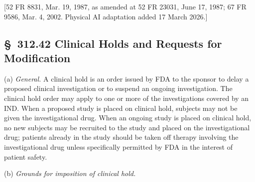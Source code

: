 [52 FR 8831, Mar. 19, 1987, as amended at 52 FR 23031, June 17, 1987; 67 FR 9586, Mar. 4, 2002. Physical AI adaptation added 17 March 2026.]

\subsection{\S~312.42 Clinical Holds and Requests for Modification}

(a) \textit{General.} A clinical hold is an order issued by FDA to the sponsor to delay a proposed clinical investigation or to suspend an ongoing investigation. The clinical hold order may apply to one or more of the investigations covered by an IND. When a proposed study is placed on clinical hold, subjects may not be given the investigational drug. When an ongoing study is placed on clinical hold, no new subjects may be recruited to the study and placed on the investigational drug; patients already in the study should be taken off therapy involving the investigational drug unless specifically permitted by FDA in the interest of patient safety.

(b) \textit{Grounds for imposition of clinical hold.}


